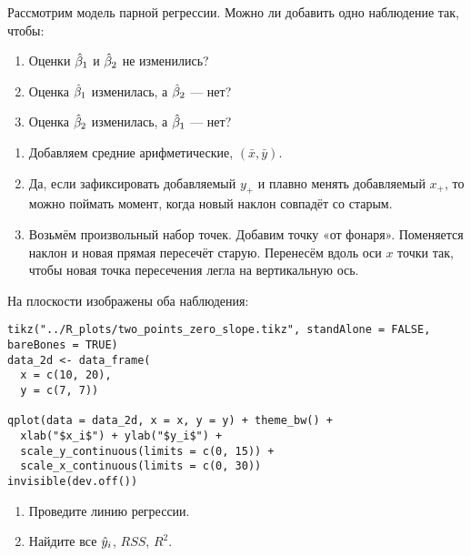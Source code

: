 \begin{problem}
Рассмотрим модель парной регрессии. Можно ли добавить одно наблюдение так, чтобы:
\begin{enumerate}
\item Оценки $\hb_1$ и $\hb_2$ не изменились?
\item Оценка $\hb_1$ изменилась, а $\hb_2$ — нет?
\item Оценка $\hb_2$ изменилась, а $\hb_1$ — нет?
\end{enumerate}

\begin{sol}
  \begin{enumerate}
  \item Добавляем средние арифметические, $(\bar x, \bar y)$.
  \item Да, если зафиксировать добавляемый $y_{+}$ и плавно менять добавляемый $x_{+}$, то можно поймать момент, когда новый наклон совпадёт со старым.
  \item Возьмём произвольный набор точек. Добавим точку «от фонаря». Поменяется наклон и новая прямая пересечёт старую. Перенесём вдоль оси $x$ точки так, чтобы новая точка пересечения легла на вертикальную ось.
  \end{enumerate}
\end{sol}
\end{problem}

\begin{problem}
На плоскости изображены оба наблюдения:

\begin{verbatim}
tikz("../R_plots/two_points_zero_slope.tikz", standAlone = FALSE, bareBones = TRUE)
data_2d <- data_frame(
  x = c(10, 20),
  y = c(7, 7))

qplot(data = data_2d, x = x, y = y) + theme_bw() +
  xlab("$x_i$") + ylab("$y_i$") +
  scale_y_continuous(limits = c(0, 15)) +
  scale_x_continuous(limits = c(0, 30))
invisible(dev.off())
\end{verbatim}



\begin{minipage}{0.6\textwidth}
\begin{center}
\begin{tikzpicture}[scale = 0.025]

\end{tikzpicture}
\end{center}
\end{minipage}

\begin{enumerate}
\item Проведите линию регрессии.
\item Найдите все $\hy_i$, $RSS$, $R^2$.
\end{enumerate}

\begin{sol}
\end{sol}
\end{problem}

